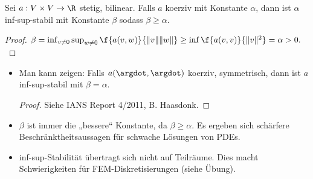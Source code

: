 \begin{st} \label{3.33}
	Sei $a: V \times V \to \R$ stetig, bilinear.
	Falls $a$ koerziv mit Konstante $\alpha$, dann ist $\alpha$ inf-sup-stabil mit Konstante $\beta$ sodass $\beta \ge \alpha$.
	\begin{proof}
		\begin{math}
			\beta
			= \inf_{v\neq 0} \sup_{w\neq 0} \f{a(v,w)}{\|v\|\|w\|}
			\ge \inf \f{a(v,v)}{\|v\|^2}
			= \alpha
			> 0.
		\end{math}
	\end{proof}
\end{st}

\begin{note}
	\begin{itemize}
		\item
			Man kann zeigen:
			Falls $a(\argdot, \argdot)$ koerziv, symmetrisch, dann ist $a$ inf-sup-stabil mit $\beta = \alpha$.
			\begin{proof}
				Siehe IANS Report 4/2011, B. Haasdonk.
			\end{proof}
		\item
			$\beta$ ist immer die „bessere“ Konstante, da $\beta \ge \alpha$.
			Es ergeben sich schärfere Beschränktheitsaussagen für schwache Lösungen von PDEs.
		\item
			inf-sup-Stabilität übertragt sich nicht auf Teilräume.
			Dies macht Schwierigkeiten für FEM-Diskretisierungen (siehe Übung).
	\end{itemize}
\end{note}

